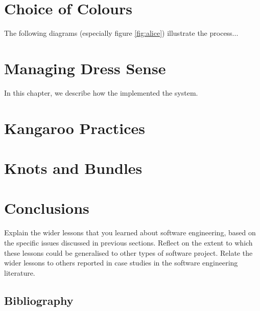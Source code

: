 \documentclass{l3proj}
\begin{document}

\section{Choice of Colours}
\label{design}

The following diagrams (especially figure \ref{fig:alice}) illustrate the
process...

\section{Managing Dress Sense}
\label{managing}

In this chapter, we describe how the implemented the system.

\section{Kangaroo Practices}



\section{Knots and Bundles}
\label{sec:managing}


\section{Conclusions}

Explain the wider lessons that you learned about software engineering,
based on the specific issues discussed in previous sections.  Reflect
on the extent to which these lessons could be generalised to other
types of software project.  Relate the wider lessons to others
reported in case studies in the software engineering literature.



\subsection{Bibliography}
\label{Bibliography}
\end{document}
